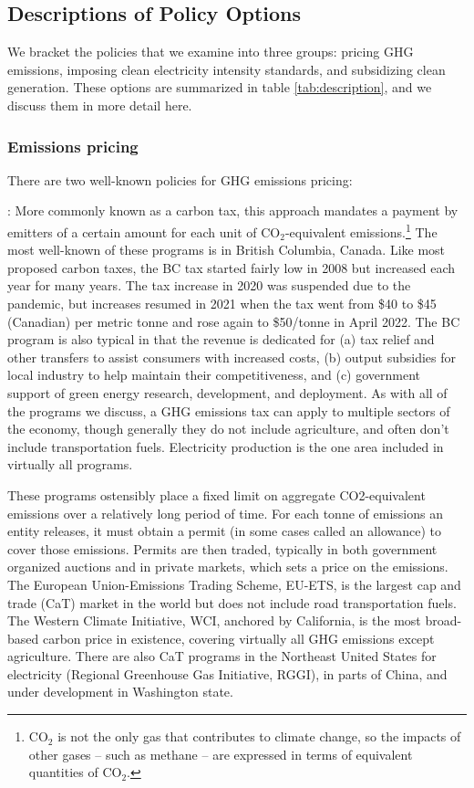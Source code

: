 \documentclass[12pt]{article}
\begin{document}
\subsection{Descriptions of Policy Options}\label{sec:descriptions}

We bracket the policies that we examine into three groups: pricing GHG emissions, imposing clean electricity intensity standards, and subsidizing clean generation. These options are summarized in table \ref{tab:description}, and we discuss them in more detail here.

\subsubsection{Emissions pricing} There are two well-known policies for GHG emissions pricing:

\medskip{}:  More commonly known as a carbon tax, this approach mandates a payment by emitters of a certain amount for each unit of CO$_2$-equivalent emissions.\footnote{CO$_2$ is not the only gas that contributes to climate change, so the impacts of other gases -- such as methane -- are expressed in terms of equivalent quantities of CO$_2$.} The most well-known of these programs is in British Columbia, Canada. Like most proposed carbon taxes, the BC tax started fairly low in 2008 but increased each year for many years. The tax increase in 2020 was suspended due to the pandemic, but increases resumed in 2021 when the tax went from \$40 to \$45 (Canadian) per metric tonne and rose again to \$50/tonne in April 2022.  The BC program is also typical in that the revenue is dedicated for (a) tax relief and other transfers to assist consumers with increased costs, (b) output subsidies for local industry to help maintain their competitiveness, and (c) government support of green energy research, development, and  deployment.  As with all of the programs we discuss, a GHG emissions tax can apply to multiple sectors of the economy, though generally they do not include agriculture, and often don't include transportation fuels. Electricity production is the one area included in virtually all programs.

\medskip{}  These programs ostensibly place a fixed limit on aggregate CO2-equivalent emissions over a relatively long period of time.  For each tonne of emissions an entity releases, it must obtain a permit (in some cases called an allowance) to cover those emissions.  Permits are then traded, typically in both government organized auctions and in private markets, which sets a price on the emissions. The European Union-Emissions Trading Scheme, EU-ETS, is the largest cap and trade (CaT) market in the world but does not include road transportation fuels. The Western Climate Initiative, WCI, anchored by California, is the most broad-based carbon price in existence, covering virtually all GHG emissions except agriculture. There are also CaT programs in the Northeast United States for electricity (Regional Greenhouse Gas Initiative, RGGI), in parts of China, and under development in Washington state. 
\end{document}
